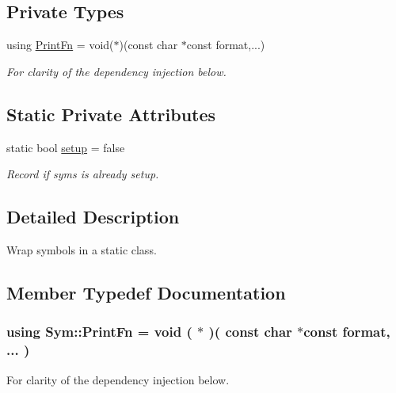 \subsection*{Private Types}
\begin{DoxyCompactItemize}
\item 
using \hyperlink{struct_sym_ac7e7dab02489b946a36daebe6ecde8ad}{Print\-Fn} = void($\ast$)(const char $\ast$const format,...)
\begin{DoxyCompactList}\small\item\em For clarity of the dependency injection below. \end{DoxyCompactList}\end{DoxyCompactItemize}
\subsection*{Static Private Attributes}
\begin{DoxyCompactItemize}
\item 
static bool \hyperlink{struct_sym_a5b0d02c05e1a5450e6dc79903615ab46}{setup} = false
\begin{DoxyCompactList}\small\item\em Record if syms is already setup. \end{DoxyCompactList}\end{DoxyCompactItemize}


\subsection{Detailed Description}
Wrap symbols in a static class. 

\subsection{Member Typedef Documentation}
\hypertarget{struct_sym_ac7e7dab02489b946a36daebe6ecde8ad}{
\subsubsection[{Print\-Fn}]{\setlength{\rightskip}{0pt plus 5cm}using {\bf Sym\-::\-Print\-Fn} =  void ( $\ast$ )( const char $\ast$const format, ... )\hspace{0.3cm}{\ttfamily [private]}}}\label{struct_sym_ac7e7dab02489b946a36daebe6ecde8ad}


For clarity of the dependency injection below. 



